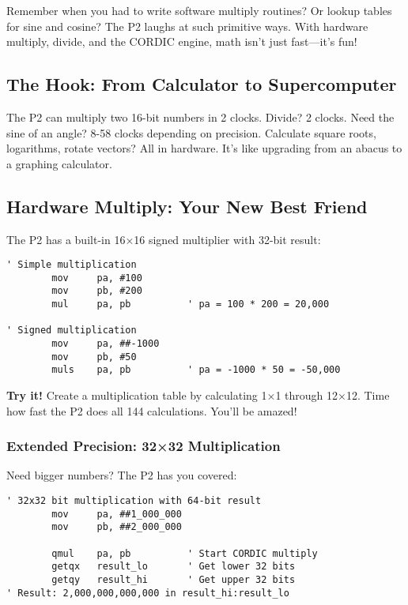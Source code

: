 \documentclass[11pt]{book}
\begin{document}
Remember when you had to write software multiply routines? Or lookup
tables for sine and cosine? The P2 laughs at such primitive ways. With
hardware multiply, divide, and the CORDIC engine, math isn't just
fast---it's fun!

\hypertarget{the-hook-from-calculator-to-supercomputer}{%
\subsection{The Hook: From Calculator to
Supercomputer}\label{the-hook-from-calculator-to-supercomputer}}

The P2 can multiply two 16-bit numbers in 2 clocks. Divide? 2 clocks.
Need the sine of an angle? 8-58 clocks depending on precision. Calculate
square roots, logarithms, rotate vectors? All in hardware. It's like
upgrading from an abacus to a graphing calculator.

\hypertarget{hardware-multiply-your-new-best-friend}{%
\subsection{Hardware Multiply: Your New Best
Friend}\label{hardware-multiply-your-new-best-friend}}

The P2 has a built-in 16×16 signed multiplier with 32-bit result:

\begin{lstlisting}
' Simple multiplication
        mov     pa, #100
        mov     pb, #200
        mul     pa, pb          ' pa = 100 * 200 = 20,000
        
' Signed multiplication
        mov     pa, ##-1000
        mov     pb, #50
        muls    pa, pb          ' pa = -1000 * 50 = -50,000
\end{lstlisting}

\textbf{Try it!} Create a multiplication table by calculating 1×1
through 12×12. Time how fast the P2 does all 144 calculations. You'll be
amazed!

\hypertarget{extended-precision-3232-multiplication}{%
\subsubsection{Extended Precision: 32×32
Multiplication}\label{extended-precision-3232-multiplication}}

Need bigger numbers? The P2 has you covered:

\begin{lstlisting}
' 32x32 bit multiplication with 64-bit result
        mov     pa, ##1_000_000
        mov     pb, ##2_000_000
        
        qmul    pa, pb          ' Start CORDIC multiply
        getqx   result_lo       ' Get lower 32 bits
        getqy   result_hi       ' Get upper 32 bits
' Result: 2,000,000,000,000 in result_hi:result_lo
\end{lstlisting}
\end{document}
